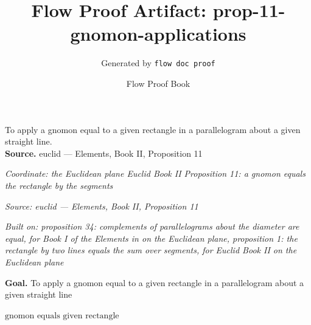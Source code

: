 \documentclass[11pt]{article}
\title{Flow Proof Artifact: prop-11-gnomon-applications}
\author{Generated by \texttt{flow doc proof}}
\date{Flow Proof Book}
\theoremstyle{definition}
\begin{document}
\maketitle
To apply a gnomon equal to a given rectangle in a parallelogram about a given straight line.\\[0.5em]
\textbf{Source.} euclid — Elements, Book II, Proposition 11\\[0.5em]
\bigskip
{}\par
\smallskip\noindent\textit{Coordinate: the Euclidean plane \cdot Euclid Book II \cdot Proposition 11: a gnomon equals the rectangle by the segments}\par
\smallskip\noindent\textit{Source: euclid — Elements, Book II, Proposition 11}\par
\smallskip\noindent\textit{Built on: proposition 34: complements of parallelograms about the diameter are equal, for Book I of the Elements in on the Euclidean plane, proposition 1: the rectangle by two lines equals the sum over segments, for Euclid Book II on the Euclidean plane}\par
\medskip
\noindent\textbf{Goal.} To apply a gnomon equal to a given rectangle in a parallelogram about a given straight line\par
\noindent$\displaystyle \text{gnomon equals given rectangle}$\par
\medskip
\noindent
\end{document}
